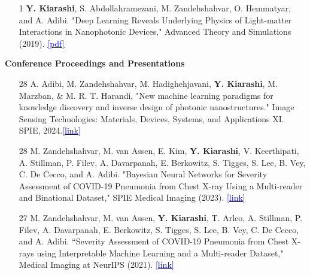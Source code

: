 \documentclass[margin, line]{res}
\newenvironment{list1}{
  \begin{list}{\ding{113}}{%
      \setlength{\itemsep}{0in}
      \setlength{\parsep}{0in} \setlength{\parskip}{0in}
      \setlength{\topsep}{0in} \setlength{\partopsep}{0in} 
      \setlength{\leftmargin}{0.17in}}}{\end{list}}
\begin{document}
\begin{resume}
\begin{list1}
\begin{itemize}
    \item [1] \textbf{Y. Kiarashi}, S. Abdollahramezani, M. Zandehshahvar, O. Hemmatyar, and A. Adibi. "Deep Learning Reveals Underlying Physics of Light-matter Interactions in Nanophotonic Devices," Advanced Theory and Simulations (2019). \href{https://onlinelibrary.wiley.com/doi/pdf/10.1002/adts.201900088%4010.1002/%28ISSN%292513-0390.Machine-Learning?casa_token=bghb_z4M07EAAAAA:oJD8PA6Sy-7PQ3JSTBPTr3w0zwjTwK7JuDt5DtsSq_Fvly446Z68KbHOGE_XfQpTroQCqrXOQ1yIeO0}{\textcolor{blue}{[pdf]}}





    
\end{itemize}
\end{list1}
\begin{list1}
\item[] \textbf{Conference Proceedings and Presentations}
\begin{itemize}

\item[28] A. Adibi, M. Zandehshahvar, M. Hadighehjavani, \textbf{Y. Kiarashi}, M. Marzban, & M. R. T. Harandi,   "New machine learning paradigms for knowledge discovery and inverse design of photonic nanostructures." Image Sensing Technologies: Materials, Devices, Systems, and Applications XI. SPIE, 2024.\href{https://doi.org/10.1117/12.3013800}{\textcolor{blue}{[link]}}

\item[28] M. Zandehshahvar, M. van Assen, E. Kim, \textbf{Y. Kiarashi}, V. Keerthipati, A. Stillman, P. Filev, A. Davarpanah, E. Berkowitz, S. Tigges, S. Lee, B. Vey, C. De Cecco, and A. Adibi. "Bayesian Neural Networks for Severity Assessment of COVID-19 Pneumonia from Chest X-ray Using a Multi-reader and Binational Dataset," SPIE Medical Imaging (2023). \href{https://www.spiedigitallibrary.org/conference-proceedings-of-spie/12465/124650G/Bayesian-neural-networks-for-severity-assessment-of-COVID-19-pneumonia/10.1117/12.2653346.short}{\textcolor{blue}{[link]}}


\item [27] M. Zandehshahvar, M. van Assen, \textbf{Y. Kiarashi}, T. Arleo, A. Stillman, P. Filev, A. Davarpanah, E. Berkowitz, S. Tigges, S. Lee, B. Vey, C. De Cecco, and A. Adibi. “Severity Assessment of COVID-19 Pneumonia from Chest X-rays using Interpretable Machine Learning and a Multi-reader Dataset," Medical Imaging at NeurIPS (2021). \href{http://www.cse.cuhk.edu.hk/~qdou/public/medneurips2021/59_CameraReady.pdf}{\textcolor{blue}{[link]}}


\end{itemize}
\end{list1}
\end{resume}
\end{document}
